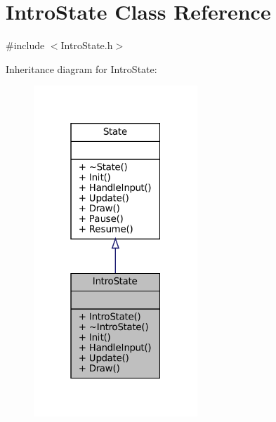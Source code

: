 \hypertarget{classIntroState}{}\section{Intro\+State Class Reference}
\label{classIntroState}


{\ttfamily \#include $<$Intro\+State.\+h$>$}



Inheritance diagram for Intro\+State\+:\nopagebreak
\begin{figure}[H]
\begin{center}
\leavevmode
\includegraphics[width=175pt]{classIntroState__inherit__graph}
\end{center}
\end{figure}


